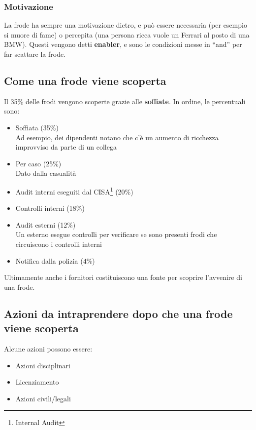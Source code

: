 \subsubsection{Motivazione}

La frode ha sempre una motivazione dietro, e può essere necessaria (per esempio
si muore di fame) o percepita (una persona ricca vuole un Ferrari al posto di
una BMW). Questi vengono detti \textbf{enabler}, e sono le condizioni messe in
``and'' per far scattare la frode.

\subsection{Come una frode viene scoperta}

Il 35\% delle frodi vengono scoperte grazie alle \textbf{soffiate}. In ordine,
le percentuali sono:
\begin{itemize}
  \item Soffiata (35\%) \\
  Ad esempio, dei dipendenti notano che c'è un aumento di ricchezza 
  improvviso da parte di un collega
  \item Per caso (25\%) \\
  Dato dalla casualità
  \item Audit interni eseguiti dal CISA\footnote{Internal Audit} (20\%)
  \item Controlli interni (18\%)
  \item Audit esterni (12\%) \\
  Un esterno esegue controlli per verificare se sono presenti frodi che
  circuiscono i controlli interni
  \item Notifica dalla polizia (4\%)
\end{itemize}

Ultimamente anche i fornitori costituiscono una fonte per scoprire l'avvenire 
di una frode.

\subsection{Azioni da intraprendere dopo che una frode viene scoperta}

Alcune azioni possono essere:
\begin{itemize}
  \item Azioni disciplinari
  \item Licenziamento
  \item Azioni civili/legali
\end{itemize}

